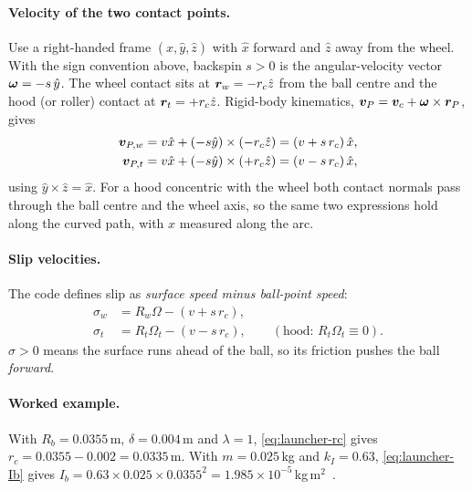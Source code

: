 \paragraph{Velocity of the two contact points.} Use a right-handed frame $(\hat{x},\hat{y},\hat{z})$ with
$\hat{x}$ forward and $\hat{z}$ away from the wheel. With the sign convention above, backspin $s>0$ is the
angular-velocity vector $\bm{\omega} = -s\,\hat{y}$. The wheel contact sits at
$\bm{r}_w = -r_c\hat{z}$ from the ball centre and the hood (or roller) contact at
$\bm{r}_t = +r_c\hat{z}$. Rigid-body kinematics, $\bm{v}_P = \bm{v}_c + \bm{\omega}\times\bm{r}_P$,
gives
\begin{align}
  \bm{v}_{P,w} &= v\hat{x} + (-s\hat{y})\times(-r_c\hat{z}) = (v + s\,r_c)\,\hat{x}, \label{eq:launcher-vpw}\\
  \bm{v}_{P,t} &= v\hat{x} + (-s\hat{y})\times(+r_c\hat{z}) = (v - s\,r_c)\,\hat{x}, \label{eq:launcher-vpt}
\end{align}
using $\hat{y}\times\hat{z} = \hat{x}$. For a hood concentric with the wheel both contact normals pass
through the ball centre and the wheel axis, so the same two expressions hold along the curved path, with
$x$ measured along the arc.

\paragraph{Slip velocities.} The code defines slip as \emph{surface speed minus ball-point speed}:
\begin{align}
  \sigma_w &= R_w\Omega - (v + s\,r_c), \label{eq:launcher-slipw}\\
  \sigma_t &= R_t\Omega_t - (v - s\,r_c), \qquad (\text{hood: } R_t\Omega_t \equiv 0). \label{eq:launcher-slipt}
\end{align}
$\sigma > 0$ means the surface runs ahead of the ball, so its friction pushes the ball \emph{forward}.

\paragraph{Worked example.} With $R_b = 0.0355$\,\unit{m}\confirmed, $\delta = 0.004$\,\unit{m}\userval{} and
$\lambda = 1$\assumed, \eqref{eq:launcher-rc} gives $r_c = 0.0355 - 0.002 = 0.0335$\,\unit{m}\derived. With
$m = 0.025$\,\unit{kg}\assumed{} and $k_I = 0.63$\assumed, \eqref{eq:launcher-Ib} gives
$I_b = 0.63\times0.025\times0.0355^2 = 1.985\times10^{-5}$\,\unit{kg\,m$^2$}\derived.

